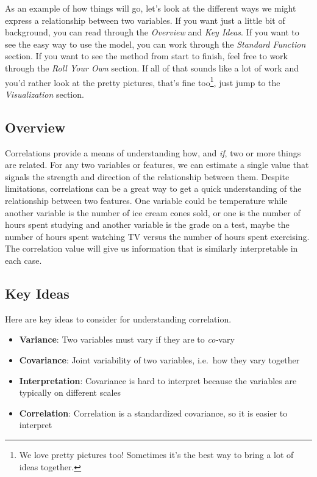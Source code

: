 \documentclass[
  letterpaper,
]{krantz}
\providecommand{\tightlist}{%
  \setlength{\itemsep}{0pt}\setlength{\parskip}{0pt}}\usepackage{longtable,booktabs,array}
\begin{document}
As an example of how things will go, let's look at the different ways we
might express a relationship between two variables. If you want just a
little bit of background, you can read through the \emph{Overview} and
\emph{Key Ideas}. If you want to see the easy way to use the model, you
can work through the \emph{Standard Function} section. If you want to
see the method from start to finish, feel free to work through the
\emph{Roll Your Own} section. If all of that sounds like a lot of work
and you'd rather look at the pretty pictures, that's fine
too\footnote{We love pretty pictures too! Sometimes it's the best way to
  bring a lot of ideas together.}, just jump to the \emph{Visualization}
section.

\subsection{Overview}\label{overview}

Correlations provide a means of understanding how, and \emph{if}, two or
more things are related. For any two variables or features, we can
estimate a single value that signals the strength and direction of the
relationship between them. Despite limitations, correlations can be a
great way to get a quick understanding of the relationship between two
features. One variable could be temperature while another variable is
the number of ice cream cones sold, or one is the number of hours spent
studying and another variable is the grade on a test, maybe the number
of hours spent watching TV versus the number of hours spent exercising.
The correlation value will give us information that is similarly
interpretable in each case.

\subsection{Key Ideas}\label{key-ideas}

Here are key ideas to consider for understanding correlation.

\begin{itemize}
\tightlist
\item
  \textbf{Variance}: Two variables must vary if they are to
  \emph{co-}vary
\item
  \textbf{Covariance}: Joint variability of two variables, i.e.~how they
  vary together
\item
  \textbf{Interpretation}: Covariance is hard to interpret because the
  variables are typically on different scales
\item
  \textbf{Correlation}: Correlation is a standardized covariance, so it
  is easier to interpret
\end{itemize}
\end{document}
